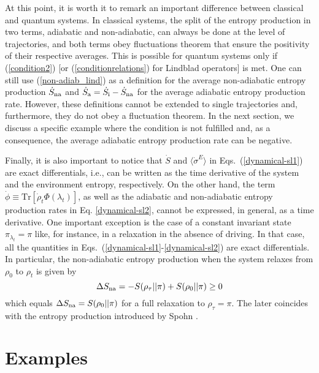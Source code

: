 \documentclass[aps,prx,twocolumn,showpacs,floatfix,superscriptaddress,graphics,longbibliography]{revtex4-1}
\newcommand{\tr}{\mathrm{Tr}}
\newcommand{\HAT}{}
\begin{document}
At this point, it is worth it to remark an important difference between classical and quantum systems.
In classical systems, the split of the entropy production in two terms, adiabatic and non-adiabatic, can always be done at the level of trajectories, and both terms obey fluctuations theorem that ensure the positivity of their respective averages. This is possible for quantum systems only if  (\ref{condition2}) [or (\ref{conditionrelations}) for Lindblad operators] is met. One can still use (\ref{non-adiab_lind}) as a definition for the average non-adiabatic entropy production $\dot S_{\rm na}$ and $\dot S_{\rm a}=\dot S_{\rm i}-\dot S_{\rm na}$ for the average adiabatic entropy production rate. However, these definitions cannot be extended to single trajectories and, furthermore, they do not obey a fluctuation theorem. In the next section, we discuss a specific example where the condition is not fulfilled and, as a consequence, the average adiabatic entropy production rate can be negative.

Finally, it is also important to notice that $\dot S$ and $\langle \dot{\sigma}^E \rangle $ in Eqs.~(\ref{dynamical-sl1}) are exact differentials, i.e., can be written as the time derivative of the system and the environment entropy, respectively. On the other hand, the term $\dot{\phi} \equiv \tr[\dot{\rho}_t \HAT{\Phi}(\lambda_t)]$, as well as the adiabatic and non-adiabatic entropy production rates in Eq. \eqref{dynamical-sl2}, cannot be expressed, in general, as a time derivative. One important exception is the case of a constant invariant state $\pi_{\lambda_t}=\pi$ like, for instance, in a relaxation in the absence of driving. In that case, all the quantities in Eqs.~(\ref{dynamical-sl1}-\ref{dynamical-sl2}) are exact differentials. In particular, the non-adiabatic entropy production when the system relaxes from $\rho_0$ to $\rho_t$ is given by
\begin{equation}\label{sna_nodriving}
\Delta S_{\rm na}=-S(\rho_\tau||\pi)+S(\rho_0||\pi)\geq 0
\end{equation}
which equals $\Delta S_{\rm na}=S(\rho_0||\pi)$ for a full relaxation to $\rho_\tau=\pi$. The later coincides with the entropy production introduced by Spohn \cite{Spohn}.


\section{Examples} \label{S-Examples}
\end{document}
